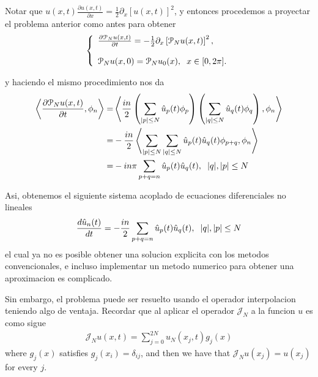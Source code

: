 		Notar que $u(x, t) \frac{\partial u(x, t)}{\partial x} = \frac{1}{2} \partial_x \left[ u(x, t) \right]^2$,
		y entonces procedemos a proyectar el problema anterior como antes para obtener
		\begin{align}
			\left \lbrace \begin{array}{ll}
				\frac{\partial \mathcal{P}_N u(x, t)}{\partial t} = - \frac{1}{2} \partial_x \left[ \mathcal{P}_N u(x, t) \right]^2, \\
				\\
				\mathcal{P}_N u(x, 0) = \mathcal{P}_N u_0(x), \hspace{2mm} x \in [0, 2 \pi].
			\end{array} \right .  
		\end{align}
		
		y haciendo el mismo procedimiento nos da
		\begin{align*}
			\left\langle \frac{\partial \mathcal{P}_N u(x, t)}{\partial t}, \phi_n  \right\rangle = & \left\langle\frac{in}{2} \left( \sum_{ |p| \leq N} \hat{u}_p (t) \phi_p \right) \left( \sum_{ |q| \leq N} \hat{u}_q (t) \phi_q \right), \phi_n \right\rangle \\
			=& - \frac{in}{2} \left\langle \sum_{ |p| \leq N} \sum_{ |q| \leq N} \hat{u}_p (t) \hat{u}_q (t) \phi_{p + q}, \phi_n \right \rangle \\
			=& - in \pi \sum_{ p + q = n} \hat{u}_p (t) \hat{u}_q (t), \hspace{2mm} |q|, |p| \leq N
		\end{align*}
		
		\noindent Asi, obtenemos el siguiente sistema acoplado de ecuaciones diferenciales no lineales
		\begin{align*}
			\frac{d \hat{u}_n (t)}{dt} = - \frac{in}{2}  \sum_{ p + q = n} \hat{u}_p (t) \hat{u}_q (t), \hspace{2mm} |q|, |p| \leq N 
		\end{align*}
		el cual ya no es posible obtener una solucion explicita con los metodos convencionales, e incluso implementar un metodo numerico para obtener una aproximacion es complicado.
		
		Sin embargo, el problema puede ser resuelto usando el operador interpolacion teniendo algo de ventaja. Recordar que al aplicar el operador $\mathcal{J}_N$ a la funcion $u$ es como sigue
		\begin{align*}
			\mathcal{J}_N u (x, t) =  \displaystyle \sum_{j=0}^{2N} u_{N} (x_j, t) g_j (x)
		\end{align*}
		where $g_j (x)$ satisfies $g_j(x_i) = \delta_{ij}$, and then we have that $\mathcal{J}_N u(x_j) = u(x_j)$ for every $j$.\\
		
